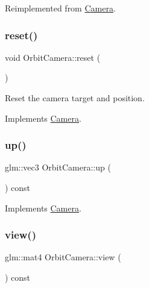 Reimplemented from \hyperlink{classCamera_ac13cc5fa7a3a5c40e53d95e987c1ff04}{Camera}.

\mbox{\label{classOrbitCamera_a022751aa06693232844732adb00e7d71}} 
\subsubsection{\texorpdfstring{reset()}{reset()}}
{\footnotesize\ttfamily void Orbit\+Camera\+::reset (\begin{DoxyParamCaption}{ }\end{DoxyParamCaption})\hspace{0.3cm}{\ttfamily [virtual]}}



Reset the camera target and position. 



Implements \hyperlink{classCamera_aa7695a960438e5571e14f50ed69f6623}{Camera}.

\mbox{\label{classOrbitCamera_a1d65d137e3ef3f32c3b8eb31b49047fc}} 
\subsubsection{\texorpdfstring{up()}{up()}}
{\footnotesize\ttfamily glm\+::vec3 Orbit\+Camera\+::up (\begin{DoxyParamCaption}{ }\end{DoxyParamCaption}) const\hspace{0.3cm}{\ttfamily [virtual]}}



Implements \hyperlink{classCamera_a3ec282533cfc02be93006259d383b6d2}{Camera}.

\mbox{\label{classOrbitCamera_a07595f9d11666c180934e47ba8abae73}} 
\subsubsection{\texorpdfstring{view()}{view()}}
{\footnotesize\ttfamily glm\+::mat4 Orbit\+Camera\+::view (\begin{DoxyParamCaption}{ }\end{DoxyParamCaption}) const\hspace{0.3cm}{\ttfamily [virtual]}}



